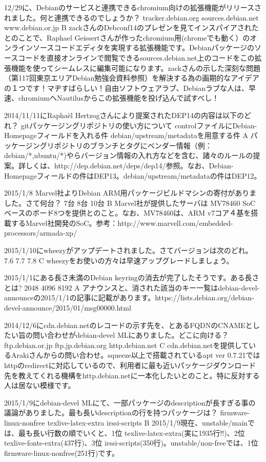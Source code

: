 %

\santaku
{12/29に、Debianのサービスと連携できるchromium向けの拡張機能がリリースされました。何と連携できるのでしょうか？}
{tracker.debian.org}
{sources.debian.net}
{www.debian.or.jp}
{B}
{zackさんのDebconf14のプレゼンを見てインスパイアされたとのことで、Raphael Geissertさんが作ったchromium用(chromeでも動く）のオンラインソースコードエディタを実現する拡張機能です。Debianパッケージのソースコードを直接オンラインで閲覧できるsources.debian.net上のコードをこの拡張機能を使ってシームレスに編集可能になります。zackさんの示した深刻な問題（第117回東京エリアDebian勉強会資料参照）を解決する為の画期的なアイデアの１つです！マヂすばらしい！自由ソフトウェアラブ、Debianラブな人は、早速、chromiumへNautilusからこの拡張機能を投げ込んで試すべし！}

\santaku
{2014/11/11にRapha\"el Hertzogさんにより提案されたDEP14の内容は以下のどれ？}
{gitパッケージングリポジトリの使い方について}
{controlファイルにDebian-Homepageフィールドを入れる件}
{debian/upstream/metadataを用意する件}
{A}
{パッケージングリポジトリのブランチとタグにベンダー情報（例：debian/*,ubuntu/*)やらバージョン情報の入れ方などを含む、諸々のルールの提案。詳しくは、http://dep.debian.net/deps/dep14/参照。なお、Debian-Homepageフィールドの件はDEP13。debian/upstream/metadataの件はDEP12。}

\santaku
{2015/1/8 Marvel社よりDebian ARM用パッケージビルドマシンの寄付がありました。さて何台？}
{7台}
{8台}
{10台}
{B}
{Marvel社が提供したサーバは MV78460 SoCベースのボード8つを提供とのこと。なお、MV78460は、ARM v7コア４基を搭載するMarvel社開発のSoC。参考：http://www.marvell.com/embedded-processors/armada-xp/}

\santaku
{2015/1/10にwheezyがアップデートされました。さてバージョンは次のどれ。}
{7.6}
{7.7}
{7.8}
{C}
{wheezyをお使いの方々は早速アップグレードしましょう。}

\santaku
{2015/1/1にある長さ未満のDebian keyringの消去が完了したそうです。ある長さとは?}
{2048}
{4096}
{8192}
{A}
{アナウンスと、消された該当のキー一覧はdebian-devel-announceの2015/1/1の記事に記載があります。https://lists.debian.org/debian-devel-announce/2015/01/msg00000.html}

\santaku
{2014/12/6にcdn.debian.netのレコードの示す先を、とあるFQDNのCNAMEとしたい旨の問い合わせがdebian-devel MLにありました。どこに向ける？}
{ftp.debian.or.jp}
{ftp.jp.debian.org}
{http.debian.net}
{C}
{cdn.debian.netを提供しているArakiさんからの問い合わせ。squeeze以上で搭載されているapt ver 0.7.21ではhttpのredirectに対応しているので、利用者に最も近いパッケージダウンロード先を教えてくれる機構をhttp.debian.netに一本化したいとのこと。特に反対する人は居ない模様です。}

\santaku
{2015/1/9にdebian-devel MLにて、一部パッケージのdescriptionが長すぎる事の議論がありました。最も長いdescriptionの行を持つパッケージは？}
{firmware-linux-nonfree}
{texlive-latex-extra}
{irssi-scripts}
{B}
{2015/1/9現在、unstable/mainでは、最も長い行数の順でいくと、1位 texlive-latex-extra(実に1935行!!)、2位 texlive-fonts-extra(437行)、3位 irssi-scripts(350行)。unstable/non-freeでは、1位 firmware-linux-nonfree(251行)です。}


